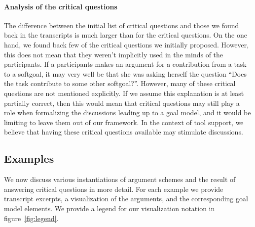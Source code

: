 \paragraph{Analysis of the critical questions} The difference between the initial list of critical questions and those we found back in the transcripts is much larger than for the critical questions. On the one hand, we found back few of the critical questions we initially proposed. However, this does not mean that they weren't implicitly used in the minds of the participants. If a participants makes an argument for a contribution from a task to a softgoal, it may very well be that she was asking herself the question ``Does the task contribute to some other softgoal?''. However, many of these critical questions are not mentioned explicitly. If we assume this explanation is at least partially correct, then this would mean that critical questions may still play a role when formalizing the discussions leading up to a goal model, and it would be limiting to leave them out of our framework. In the context of tool support, we believe that having these critical questions available may stimulate discussions.

\subsection{Examples}
\label{sect:gmas:examples}

We now discuss various instantiations of argument schemes and the result of answering critical questions in more detail. For each example we provide transcript excerpts, a visualization of the arguments, and the corresponding goal model elements. We provide a legend for our visualization notation in figure~\ref{fig:legend}.

